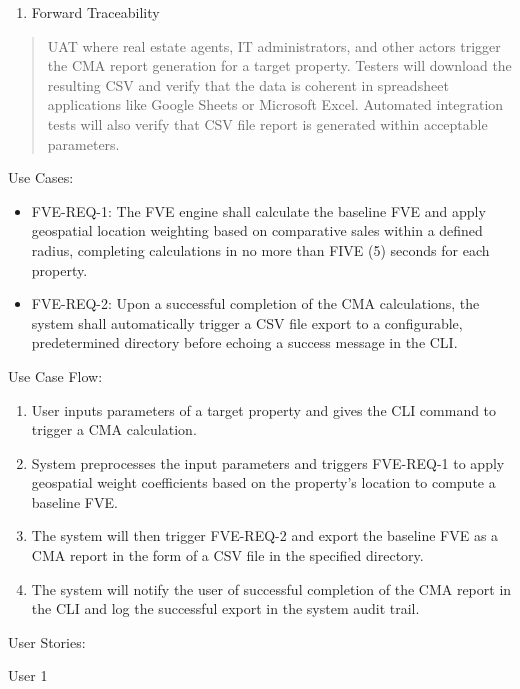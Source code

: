 \begin{enumerate}
\def\labelenumi{\alph{enumi}.}
\item
  Forward Traceability
\end{enumerate}

\begin{quote}
UAT where real estate agents, IT administrators, and other actors
trigger the CMA report generation for a target property. Testers will
download the resulting CSV and verify that the data is coherent in
spreadsheet applications like Google Sheets or Microsoft Excel.
Automated integration tests will also verify that CSV file report is
generated within acceptable parameters.
\end{quote}

Use Cases:

\begin{itemize}
\item
  FVE-REQ-1: The FVE engine shall calculate the baseline FVE and apply
  geospatial location weighting based on comparative sales within a
  defined radius, completing calculations in no more than FIVE (5)
  seconds for each property.
\item
  FVE-REQ-2: Upon a successful completion of the CMA calculations, the
  system shall automatically trigger a CSV file export to a
  configurable, predetermined directory before echoing a success message
  in the CLI.
\end{itemize}

Use Case Flow:

\begin{enumerate}
\def\labelenumi{\arabic{enumi}.}
\item
  User inputs parameters of a target property and gives the CLI command
  to trigger a CMA calculation.
\item
  System preprocesses the input parameters and triggers FVE-REQ-1 to
  apply geospatial weight coefficients based on the property's location
  to compute a baseline FVE.
\item
  The system will then trigger FVE-REQ-2 and export the baseline FVE as
  a CMA report in the form of a CSV file in the specified directory.
\item
  The system will notify the user of successful completion of the CMA
  report in the CLI and log the successful export in the system audit
  trail.
\end{enumerate}

User Stories:

User 1

